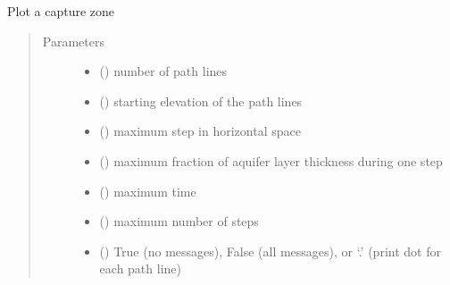 \documentclass[letterpaper,10pt,english]{sphinxmanual}
\begin{document}
\begin{fulllineitems}
\begin{fulllineitems}
\begin{quote}
\begin{description}
\end{description}\end{quote}

\end{fulllineitems}


\begin{fulllineitems}
\label{\detokenize{wells/headwell:timml.well.HeadWell.plotcapzone}}
Plot a capture zone
\begin{quote}\begin{description}
\item[{Parameters}] \leavevmode\begin{itemize}
\item {} 
 () \textendash{} number of path lines

\item {} 
 () \textendash{} starting elevation of the path lines

\item {} 
 () \textendash{} maximum step in horizontal space

\item {} 
 () \textendash{} maximum fraction of aquifer layer thickness during one step

\item {} 
 () \textendash{} maximum time

\item {} 
 (\sphinxstyleliteralemphasis{(}\sphinxstyleliteralemphasis{)}) \textendash{} maximum number of steps

\item {} 
 () \textendash{} True (no messages), False (all messages), or ‘.’
(print dot for each path line)


\end{itemize}
\end{description}
\end{quote}
\end{fulllineitems}
\end{fulllineitems}
\end{document}
